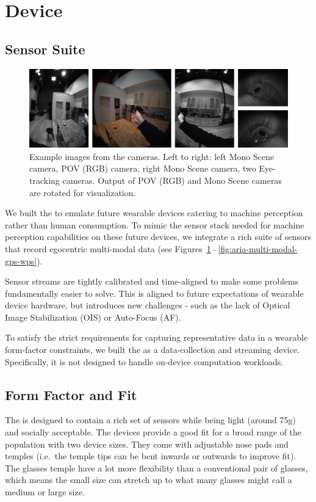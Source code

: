 \section{Device}
\label{sec:device}

\subsection{Sensor Suite}
\begin{figure}[t]
    \includegraphics[width=\linewidth]{images/sampledata/CameraSampleImages.jpg}
    \caption{Example images from the \AriaDevice{} cameras. Left to right: left Mono Scene camera, POV (RGB) camera, right Mono Scene camera, two Eye-tracking cameras. Output of POV (RGB) and Mono Scene cameras are rotated for visualization.}
    \label{fig:aria-multi-modal-scene-cameras}
\end{figure}


We built the \AriaDevice{} to emulate future wearable devices catering to machine perception rather than human consumption. To mimic the sensor stack needed for machine perception capabilities on these future devices, we integrate a rich suite of sensors that record egocentric multi-modal data (see 
Figures~\ref{fig:aria-multi-modal-scene-cameras}\,--\,\ref{fig:aria-multi-modal-gps-wps}).

Sensor streams are tightly calibrated and time-aligned to make some problems fundamentally easier to solve.  This is aligned to future expectations of wearable device hardware, but introduces new challenges - such as the lack of Optical Image Stabilization (OIS) or Auto-Focus (AF). 

To satisfy the strict requirements for capturing representative data in a wearable form-factor constraints, we built the \AriaDevice{} as a data-collection and streaming device. Specifically, it is not designed to handle on-device computation workloads.


\subsection{Form Factor and Fit}
The \AriaDevice{} is designed to contain a rich set of sensors while being light (around 75g) and socially acceptable. The devices provide a good fit for a broad range of the population with two device sizes. They come with adjustable nose pads and temples (i.e.~the temple tips can be bent inwards or outwards to improve fit). The glasses temple have a lot more flexibility than a conventional pair of glasses, which means the small size can stretch up to what many glasses might call a medium or large size. 


